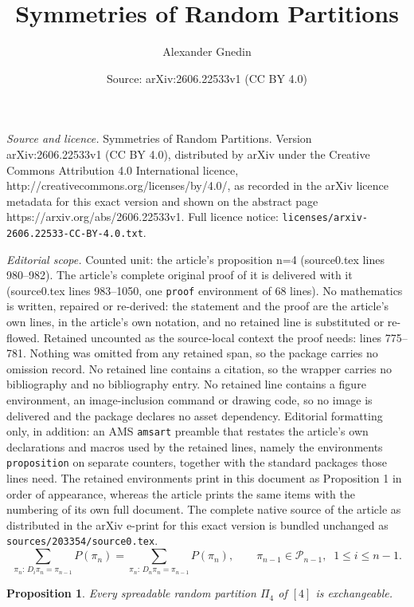 \documentclass[10pt,a4paper]{amsart}
\title{{Symmetries of Random Partitions}}
\author{Alexander Gnedin}
\date{Source: arXiv:2606.22533v1 (CC BY 4.0)}
\newtheorem{proposition}{Proposition}
\begin{document}
\maketitle

\noindent\emph{Source and licence.} {Symmetries of Random Partitions}. Version arXiv:2606.22533v1 (CC BY 4.0), distributed by arXiv under the Creative Commons Attribution 4.0 International licence, http://creativecommons.org/licenses/by/4.0/, as recorded in the arXiv licence metadata for this exact version and shown on the abstract page https://arxiv.org/abs/2606.22533v1. Full licence notice: \texttt{licenses/arxiv-2606.22533-CC-BY-4.0.txt}.\par\smallskip

\noindent\textit{Editorial scope.} Counted unit: the article's proposition n=4 (source0.tex lines 980--982). The article's complete original proof of it is delivered with it (source0.tex lines 983--1050, one \texttt{proof} environment of 68 lines). No mathematics is written, repaired or re-derived: the statement and the proof are the article's own lines, in the article's own notation, and no retained line is substituted or re-flowed.  Retained uncounted as the source-local context the proof needs: lines 775--781.  Nothing was omitted from any retained span, so the package carries no omission record.  No retained line contains a citation, so the wrapper carries no bibliography and no bibliography entry.  No retained line contains a figure environment, an image-inclusion command or drawing code, so no image is delivered and the package declares no asset dependency.  Editorial formatting only, in addition: an AMS \texttt{amsart} preamble that restates the article's own declarations and macros used by the retained lines, namely the environments \texttt{proposition} on separate counters, together with the standard packages those lines need.  The retained environments print in this document as Proposition 1 in order of appearance, whereas the article prints the same items with the numbering of its own full document.  The complete native source of the article as distributed in the arXiv e-print for this exact version is bundled unchanged as \texttt{sources/203354/source0.tex}.
\begin{equation}\label{SprRule}
\sum_{\pi_n:\,D_i\pi_n=\pi_{n-1}} P(\pi_n)
=
\sum_{\pi_n:\,D_n\pi_n=\pi_{n-1}} P(\pi_n),
\qquad
\pi_{n-1}\in{\mathcal P}_{n-1},\;\;1\le i\le n-1 .
\end{equation}

\begin{proposition}\label{n=4}
Every spreadable random partition $\Pi_4$ of $[4]$ is exchangeable.
\end{proposition}
\end{document}
